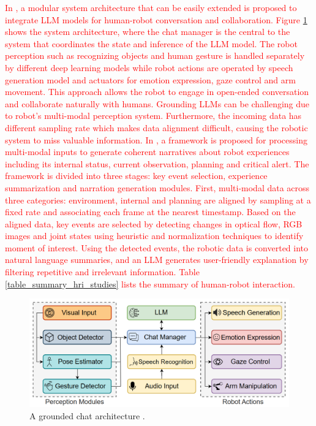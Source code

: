 \documentclass[preprint,12pt]{elsarticle}
\begin{document}
\textcolor{red}{In \citep{allgeuer_when_2024}, a modular system architecture that can be easily extended is proposed to integrate LLM models for human-robot conversation and collaboration. Figure \ref{fig_grounded_chat_architecture} shows the system architecture, where the chat manager is the central to the system that coordinates the state and inference of the LLM model.  The robot perception such as recognizing objects and human gesture is handled separately by different deep learning models while robot actions are operated by speech generation model and actuators for emotion expression, gaze control and arm movement. This approach allows the robot to engage in open-ended conversation and collaborate naturally with humans. Grounding LLMs can be challenging due to robot's multi-modal perception system. Furthermore, the incoming data has different sampling rate which makes data alignment difficult, causing the robotic system to miss valuable information. In \citep{wang_i_2024}, a framework is proposed for processing multi-modal inputs to generate coherent narratives about robot experiences including its internal status, current observation, planning and critical alert. The framework is divided into three stages: key event selection, experience summarization and narration generation modules. First, multi-modal data across three categories: environment, internal and planning are aligned by sampling at a fixed rate and associating each frame at the nearest timestamp. Based on the aligned data, key events are selected by detecting changes in optical flow, RGB images and joint states using heuristic and normalization techniques to identify moment of interest. Using the detected events, the robotic data is converted into natural language summaries, and an LLM generates user-friendly explanation by filtering repetitive and irrelevant information. Table \ref{table_summary_hri_studies} lists the summary of human-robot interaction.}

\begin{figure}[h!]
    \centering
    \includegraphics[scale=0.6]{fig_hri_llm_grounding_architecture.png}
    \caption{A grounded chat architecture \citep{allgeuer_when_2024}.}
    \label{fig_grounded_chat_architecture}
\end{figure}
\end{document}
